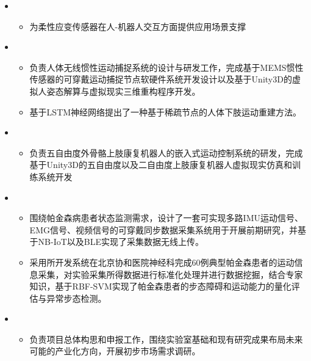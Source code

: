 \begin{itemize}[leftmargin=*]
    \item {}
    {\small
    \begin{itemize}
      \item 为柔性应变传感器在人-机器人交互方面提供应用场景支撑
    \end{itemize}
    }
    \item {}
    {\small
    \begin{itemize}
      \item 负责人体无线惯性运动捕捉系统的设计与研发工作，完成基于MEMS惯性传感器的可穿戴运动捕捉节点软硬件系统开发设计以及基于Unity3D的虚拟人姿态解算与虚拟现实三维重构程序开发。
      \item 基于LSTM神经网络提出了一种基于稀疏节点的人体下肢运动重建方法。
    \end{itemize}
    }
    \item {}
    {\small
    \begin{itemize}
      \item 负责五自由度外骨骼上肢康复机器人的嵌入式运动控制系统的研发，完成基于Unity3D的五自由度以及二自由度上肢康复机器人虚拟现实仿真和训练系统开发
    \end{itemize}
    }
    \item {}
    {\small
    \begin{itemize}
      \item 围绕帕金森病患者状态监测需求，设计了一套可实现多路IMU运动信号、EMG信号、视频信号的可穿戴同步数据采集系统用于开展前期研究，并基于NB-IoT以及BLE实现了采集数据无线上传。
      \item 采用所开发系统在北京协和医院神经科完成60例典型帕金森患者的运动信息采集，对实验采集所得数据进行标准化处理并进行数据挖掘，结合专家知识，基于RBF-SVM实现了帕金森患者的步态障碍和运动能力的量化评估与异常步态检测。
    \end{itemize}
    }
    \item {}
    {\small
    \begin{itemize}
      \item 负责项目总体构思和申报工作，围绕实验室基础和现有研究成果布局未来可能的产业化方向，开展初步市场需求调研。
    \end{itemize}
    }
  \end{itemize}